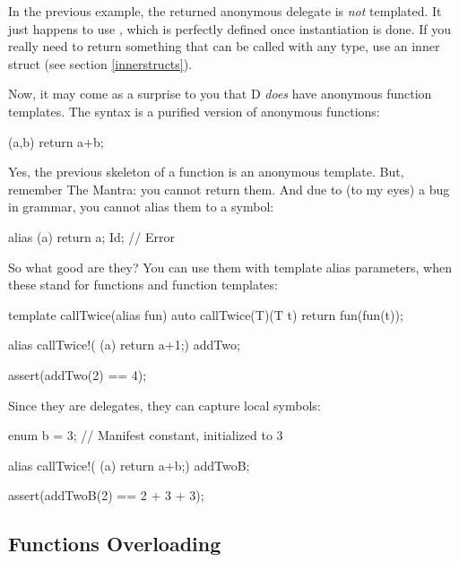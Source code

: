 In the previous example, the returned anonymous delegate is \emph{not} templated. It just happens to use , which is perfectly defined once instantiation is done. If you really need to return something that can be called with any type, use an inner struct (see section \ref{innerstructs}).

Now, it may come as a surprise to you that D \emph{does} have anonymous function templates. The syntax is a purified version of anonymous functions:

\begin{dcode}
(a,b) { return a+b;} 
\end{dcode} 

Yes, the previous skeleton of a function is an anonymous template. But, remember The Mantra: you cannot return them. And due to (to my eyes) a bug in  grammar, you cannot alias them to a symbol:

\begin{dcode}
alias (a){ return a;} Id; // Error
\end{dcode}

So what good are they? You can use them with template alias parameters, when these stand for functions and function templates:

\begin{dcode}
template callTwice(alias fun)
{
    auto callTwice(T)(T t)
    {
        return fun(fun(t));
    }
}

alias callTwice!( (a){ return a+1;}) addTwo;

assert(addTwo(2) == 4);
\end{dcode}

Since they are delegates, they can capture local symbols:

\begin{dcode}
enum b = 3; // Manifest constant, initialized to 3

alias callTwice!( (a){ return a+b;}) addTwoB;

assert(addTwoB(2) == 2 + 3 + 3);
\end{dcode}

\subsection{Functions Overloading}\label{functionsoverloading}

